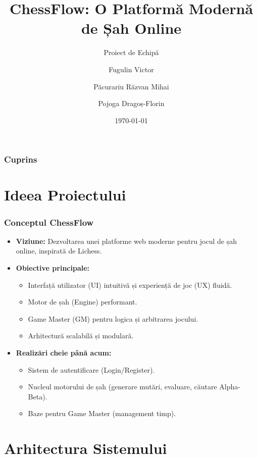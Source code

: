 \documentclass{beamer}
\title[ChessFlow]{ChessFlow: O Platformă Modernă de Șah Online}
\subtitle{Proiect de Echipă}
\author[Fugulin, Păcurariu, Pojoga]{Fugulin Victor \and Păcurariu Răzvan Mihai \and Pojoga Dragoș-Florin}
\institute[FMI - Info]
\date{\today}
\begin{document}
\begin{frame}
    \titlepage
\end{frame}

\begin{frame}
    \frametitle{Cuprins}
    \tableofcontents %
\end{frame}

\section{Ideea Proiectului}

\begin{frame}
    \frametitle{Conceptul ChessFlow}
    \begin{itemize}
        \item \textbf{Viziune:} Dezvoltarea unei platforme web moderne pentru jocul de șah online, inspirată de Lichess.
        \item \textbf{Obiective principale:}
        \begin{itemize}
            \item Interfață utilizator (UI) intuitivă și experiență de joc (UX) fluidă.
            \item Motor de șah (Engine) performant.
            \item Game Master (GM) pentru logica și arbitrarea jocului.
            \item Arhitectură scalabilă și modulară.
        \end{itemize}
        \item \textbf{Realizări cheie până acum:}
        \begin{itemize}
            \item Sistem de autentificare (Login/Register).
            \item Nucleul motorului de șah (generare mutări, evaluare, căutare Alpha-Beta).
            \item Baze pentru Game Master (management timp).
        \end{itemize}
    \end{itemize}
\end{frame}

\section{Arhitectura Sistemului}
\end{document}
